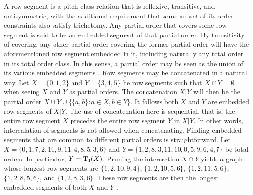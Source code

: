 A row segment is a pitch-class relation that is reflexive, transitive, and antisymmetric, with the additional requirement that some subset of its order constraints also satisfy trichotomy. Any partial order that covers some row segment is said to be an embedded segment of that partial order. By transitivity of covering, any other partial order covering the former partial order will have the aforementioned row segment embedded in it, including naturally any total order in its total order class. In this sense, a partial order may be seen as the union of its various embedded segments \cite[198]{Starr1984}. Row segments may be concatenated in a natural way. Let $X = \{ 0, 1, 2 \}$ and $Y = \{ 3, 4, 5 \}$ be row segments such that $X \cap Y = \emptyset$ when seeing $X$ and $Y$ as partial orders. The concatenation $X | Y$ will then be the partial order $X \cup Y \cup \{ \{ a, b \} : a \in X, b \in Y \}$. It follows both $X$ and $Y$ are embedded row segments of $X | Y$. The use of concatenation here is sequential, that is, the entire row segment $X$ precedes the entire row segment $Y$ in $X | Y$. In other words, intercalation of segments is not allowed when concatenating. Finding embedded segments that are common to different partial orders is straightforward. Let $X = \{ 0, 1, 7, 2, 10, 9, 11, 4, 8, 5, 3, 6 \}$ and $Y = \{ 1, 2, 8, 3, 11, 10, 0, 5, 9, 6, 4, 7 \}$ be total orders. In particular, $Y = \operatorname{T}_1(X)$. Pruning the intersection $X \cap Y$ yields a graph whose longest row segments are $\{ 1, 2, 10, 9, 4 \}$, $\{ 1, 2, 10, 5, 6 \}$, $\{ 1, 2, 11, 5, 6 \}$, $\{ 1, 2, 8, 5, 6 \}$, and $\{ 1, 2, 8, 3, 6 \}$. These row segments are then the longest embedded segments of both $X$ and $Y$ \cite[200]{Starr1984}.

